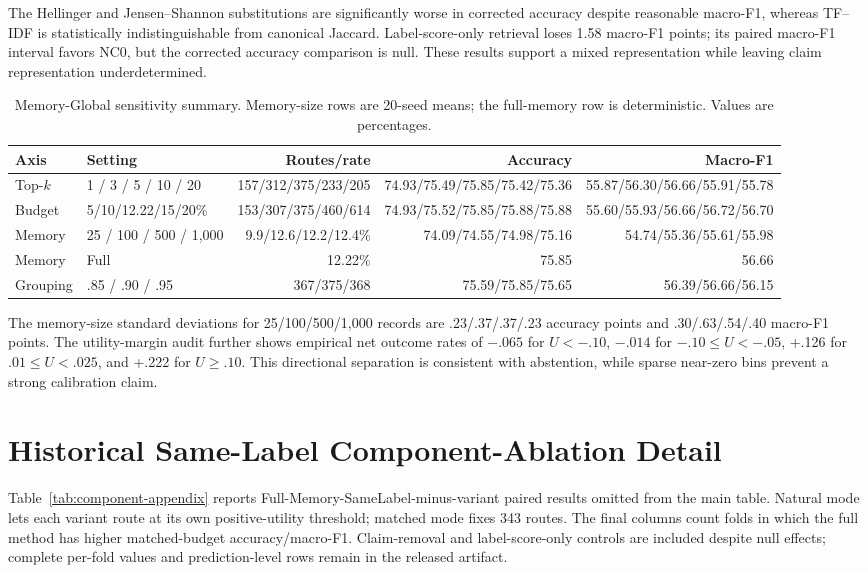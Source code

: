 \documentclass[runningheads]{llncs}
\begin{document}
The Hellinger and Jensen--Shannon substitutions are significantly worse in
corrected accuracy despite reasonable macro-F1, whereas TF--IDF is
statistically indistinguishable from canonical Jaccard. Label-score-only
retrieval loses 1.58 macro-F1 points; its paired macro-F1 interval favors NC0,
but the corrected accuracy comparison is null. These results support a mixed
representation while leaving claim representation underdetermined.

\begin{table}[t]
\caption{Memory-Global sensitivity summary. Memory-size rows are 20-seed means;
the full-memory row is deterministic. Values are percentages.}
\label{tab:ne-appendix}
\centering\small
\begin{tabular}{llrrr}
\toprule
Axis & Setting & Routes/rate & Accuracy & Macro-F1 \\
\midrule
Top-$k$ & 1 / 3 / 5 / 10 / 20 & 157/312/375/233/205 & 74.93/75.49/75.85/75.42/75.36 & 55.87/56.30/56.66/55.91/55.78 \\
Budget & 5/10/12.22/15/20\% & 153/307/375/460/614 & 74.93/75.52/75.85/75.88/75.88 & 55.60/55.93/56.66/56.72/56.70 \\
Memory & 25 / 100 / 500 / 1,000 & 9.9/12.6/12.2/12.4\% & 74.09/74.55/74.98/75.16 & 54.74/55.36/55.61/55.98 \\
Memory & Full & 12.22\% & 75.85 & 56.66 \\
Grouping & .85 / .90 / .95 & 367/375/368 & 75.59/75.85/75.65 & 56.39/56.66/56.15 \\
\bottomrule
\end{tabular}
\end{table}

The memory-size standard deviations for 25/100/500/1,000 records are
.23/.37/.37/.23 accuracy points and .30/.63/.54/.40 macro-F1 points. The
utility-margin audit further shows empirical net outcome rates of $-.065$ for
$U<-.10$, $-.014$ for $-.10\leq U<-.05$, +.126 for
$.01\leq U<.025$, and +.222 for $U\geq.10$. This directional separation is
consistent with abstention, while sparse near-zero bins prevent a strong
calibration claim.

\section{Historical Same-Label Component-Ablation Detail}

Table~\ref{tab:component-appendix} reports Full-Memory-SameLabel-minus-variant
paired results omitted from the main table. Natural mode lets each variant
route at its own positive-utility threshold; matched mode fixes 343 routes.
The final columns count folds in which the full method has higher matched-budget
accuracy/macro-F1. Claim-removal and label-score-only controls are included
despite null effects; complete per-fold values and
prediction-level rows remain in the released artifact.
\end{document}
